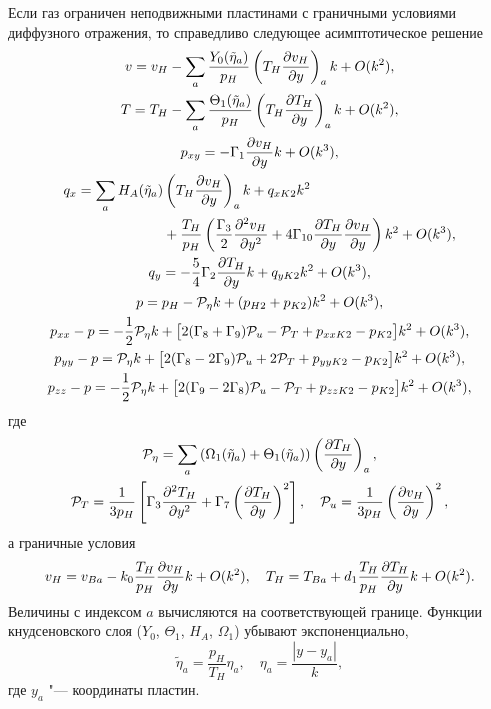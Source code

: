Если газ ограничен неподвижными пластинами с граничными условиями диффузного отражения,
то справедливо следующее асимптотическое решение
\begin{gather}
    v = v_H - \sum_a\frac{Y_0(\tilde\eta_a)}{p_H}\left(T_H\pder[v_H]{y}\right)_ak + \OO{k^2}, \label{eq:1d:v}\\
    T = T_H - \sum_a\frac{\Theta_1(\tilde\eta_a)}{p_H}\left(T_H\pder[T_H]{y}\right)_ak + \OO{k^2}, \label{eq:1d:T}\\
    p_{xy} = -\Gamma_1\pder[v_H]{y}k + \OO{k^3}, \label{eq:1d:p_xy}\\
    \begin{aligned}
        q_x = \sum_a H_A(\tilde\eta_a) &\left(T_H\pder[v_H]{y}\right)_ak + q_{xK2}k^2 \\
        &+ \frac{T_H}{p_H}\left( \frac{\Gamma_3}2 \pderdual[v_H]{y}
            + 4\Gamma_{10} \pder[T_H]{y}\pder[v_H]{y} \right)k^2 + \OO{k^3},
    \end{aligned}\label{eq:1d:q_x}\\
    q_y = -\frac54\Gamma_2\pder[T_H]{y}k + q_{yK2}k^2 + \OO{k^3}, \label{eq:1d:q_y}\\
    p = p_H - \mathcal{P}_\eta k + (p_{H2} + p_{K2})k^2 + \OO{k^3}, \label{eq:1d:p}\\
    p_{xx} - p = -\frac12 \mathcal{P}_\eta k
        + \big[ 2(\Gamma_8+\Gamma_9)\mathcal{P}_u - \mathcal{P}_T + p_{xxK2}-p_{K2}\big]k^2
        + \OO{k^3}, \label{eq:1d:Pxx}\\
    p_{yy} - p = \mathcal{P}_\eta k
        + \big[ 2(\Gamma_8-2\Gamma_9)\mathcal{P}_u + 2\mathcal{P}_T + p_{yyK2}-p_{K2} \big]k^2
        + \OO{k^3}, \label{eq:1d:Pyy}\\
    p_{zz} - p = -\frac12 \mathcal{P}_\eta k
        + \big[ 2(\Gamma_9-2\Gamma_8)\mathcal{P}_u - \mathcal{P}_T + p_{zzK2}-p_{K2} \big]k^2
        + \OO{k^3}, \label{eq:1d:Pzz}
\end{gather}
где
\begin{gather}\label{eq:mathcal_P_def}
    \mathcal{P}_\eta = \sum_a\left(\Omega_1(\tilde\eta_a)+\Theta_1(\tilde\eta_a)\right)\left(\pder[T_H]{y}\right)_a, \\
    \mathcal{P}_T = \frac1{3p_H}\left[\Gamma_3 \pderdual[T_H]{y} + \Gamma_7\left(\pder[T_H]{y}\right)^2\right], \quad
    \mathcal{P}_u = \frac1{3p_H}\left(\pder[v_H]{y}\right)^2,
\end{gather}
а граничные условия
\begin{equation}\label{eq:1d:bc}
    v_H = v_{Ba} - k_0\frac{T_H}{p_H}\pder[v_H]{y}k + \OO{k^2}, \quad
    T_H = T_{Ba} + d_1\frac{T_H}{p_H}\pder[T_H]{y}k + \OO{k^2}.
\end{equation}
Величины с индексом \(a\) вычисляются на соответствующей границе.
Функции кнудсеновского слоя (\(Y_0\), \(\Theta_1\), \(H_A\), \(\Omega_1\)) убывают экспоненциально,
\begin{equation}\label{eq:nonlinear_knudsen_functions}
    \tilde\eta_a = \frac{p_H}{T_H}\eta_a, \quad \eta_a = \frac{|y-y_a|}{k},
\end{equation}
где \(y_a\) "--- координаты пластин.

